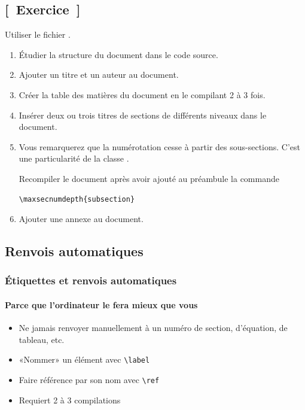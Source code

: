 \subsection{[~Exercice~]}

\begin{exercice}
  Utiliser le fichier .

  \begin{enumerate}
  \item Étudier la structure du document dans le code source.
  \item Ajouter un titre et un auteur au document.
  \item Créer la table des matières du document en le compilant 2 à 3
    fois.
  \item Insérer deux ou trois titres de sections de différents niveaux
    dans le document.
  \item Vous remarquerez que la numérotation cesse à partir des
    sous-sections. C'est une particularité de la classe
    .

    Recompiler le document après avoir ajouté au préambule la commande
\begin{lstlisting}
\maxsecnumdepth{subsection}
\end{lstlisting}
  \item Ajouter une annexe au document.
  \end{enumerate}
\end{exercice}

\subsection{Renvois automatiques}

\begin{frame}[fragile=singleslide]
  \frametitle{Étiquettes et renvois automatiques}
  \framesubtitle{Parce que l'ordinateur le fera mieux que vous}

  \begin{itemize}
  \item Ne \alert{jamais} renvoyer manuellement à un numéro de
    section, d'équation, de tableau, etc.
  \item «Nommer» un élément avec \verb=\label=
  \item Faire référence par son nom avec \verb=\ref=
  \item Requiert 2 à 3 compilations
  \end{itemize}
\end{frame}

